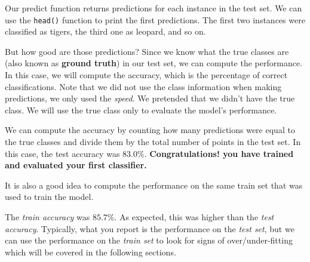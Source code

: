 \documentclass[
  11pt,
]{krantz}
\newenvironment{Shaded}{\begin{snugshade}}{\end{snugshade}}
\newcommand{\CommentTok}[1]{\textcolor[rgb]{0.37,0.37,0.37}{\textit{#1}}}
\newcommand{\FunctionTok}[1]{\textcolor[rgb]{0,0,0}{#1}}
\newcommand{\NormalTok}[1]{#1}
\newcommand{\OtherTok}[1]{\textcolor[rgb]{0.37,0.37,0.37}{#1}}
\newcommand{\SpecialCharTok}[1]{\textcolor[rgb]{0,0,0}{#1}}
\begin{document}
Our predict function returns predictions for each instance in the test set. We can use the \texttt{head()} function to print the first predictions. The first two instances were classified as tigers, the third one as leopard, and so on.

But how good are those predictions? Since we know what the true classes are (also known as \textbf{ground truth}) in our test set, we can compute the performance. In this case, we will compute the accuracy, which is the percentage of correct classifications. Note that we did not use the class information when making predictions, we only used the \emph{speed}. We pretended that we didn't have the true class. We will use the true class only to evaluate the model's performance.

\begin{Shaded}
\end{Shaded}

We can compute the accuracy by counting how many predictions were equal to the true classes and divide them by the total number of points in the test set. In this case, the test accuracy was \(83.0\%\). \textbf{Congratulations! you have trained and evaluated your first classifier.}

It is also a good idea to compute the performance on the same train set that was used to train the model.

\begin{Shaded}
\end{Shaded}

The \emph{train accuracy} was \(85.7\%\). As expected, this was higher than the \emph{test accuracy}. Typically, what you report is the performance on the \emph{test set}, but we can use the performance on the \emph{train set} to look for signs of over/under-fitting which will be covered in the following sections.
\end{document}
